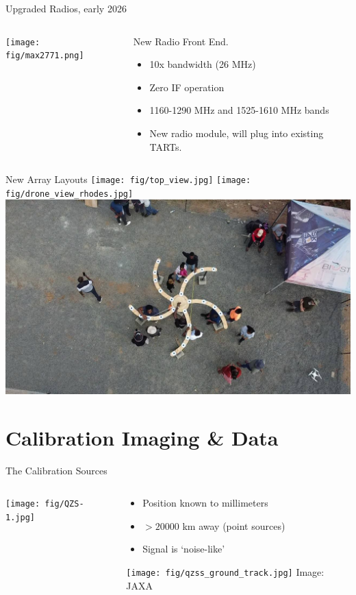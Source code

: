 \documentclass[ignorenonframetext]{beamer}
\begin{document}
\begin{frame}{Upgraded Radios, early 2026}
  \begin{columns}
  \begin{column}{0.4\linewidth}
    \texttt{[image: fig/max2771.png]}
  \end{column}
  \begin{column}{0.6\linewidth}
  New Radio Front End.
\begin{itemize}
 \item 10x bandwidth (26 MHz)
 \item Zero IF operation
 \item 1160-1290 MHz and 1525-1610 MHz bands
 \item New radio module, will plug into existing TARTs.
\end{itemize}
  \end{column}
  \end{columns}
\end{frame}

\begin{frame}{New Array Layouts}
\centering
 \texttt{[image: fig/top\_view.jpg]}
 \texttt{[image: fig/drone\_view\_rhodes.jpg]}
 \includegraphics[width=0.6\linewidth]{fig/biust_from_above.jpg}
\end{frame}

\section{Calibration Imaging \& Data}

\frame{\tableofcontents[currentsection]}


\begin{frame}{The Calibration Sources}
 \begin{columns}
  \begin{column}{0.5\linewidth}
   \texttt{[image: fig/QZS-1.jpg]}
  \end{column}
  \begin{column}{0.5\linewidth}
  \begin{itemize}
   \item Position known to millimeters
   \item $>20000$ km away (point sources)
   \item Signal is `noise-like'
  \end{itemize}
   \texttt{[image: fig/qzss\_ground\_track.jpg]}
   {\tiny Image: JAXA}
  \end{column}
 \end{columns}
\end{frame}
\end{document}
